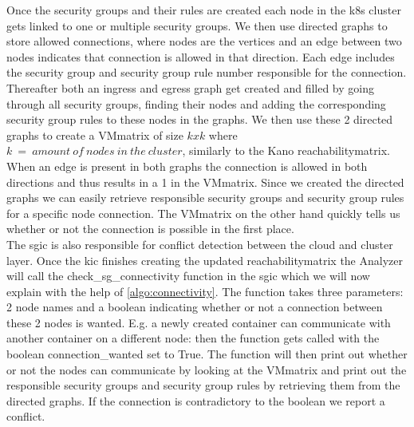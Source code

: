Once the security groups and their rules are created each node in the \acrshort{k8s} cluster gets linked to one or multiple security groups. We then use directed graphs to store allowed connections, where nodes are the vertices and an edge between two nodes indicates that connection is allowed in that direction. Each edge includes the security group and security group rule number responsible for the connection. Thereafter both an ingress and egress graph get created and filled by going through all security groups, finding their nodes and adding the corresponding security group rules to these nodes in the graphs. We then use these 2 directed graphs to create a VMmatrix of size \(kxk\) where \(k\ =\ amount\  of\  nodes\  in\  the\  cluster\), similarly to the Kano reachabilitymatrix. When an edge is present in both graphs the connection is allowed in both directions and thus results in a 1 in the VMmatrix. Since we created the directed graphs we can easily retrieve responsible security groups and security group rules for a specific node connection. The VMmatrix on the other hand quickly tells us whether or not the connection is possible in the first place.
\\[10pt]

The \acrlong{sgic} is also responsible for conflict detection between the cloud and cluster layer. Once the \acrshort{kic} finishes creating the updated reachabilitymatrix the Analyzer will call the check\_sg\_connectivity function in the \acrshort{sgic} which we will now explain with the help of \autoref{algo:connectivity}. The function takes three parameters: 2 node names and a boolean indicating whether or not a connection between these 2 nodes is wanted. E.g. a newly created container can communicate with another container on a different node: then the function gets called with the boolean connection\_wanted set to True. The function will then print out whether or not the nodes can communicate by looking at the VMmatrix and print out the responsible security groups and security group rules by retrieving them from the directed graphs. If the connection is contradictory to the boolean we report a conflict.





\cleardoublepage


